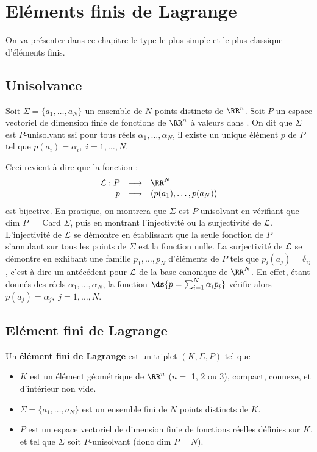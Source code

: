 \chapter{Eléments finis de Lagrange}
%
%
\noindent
On va présenter dans ce chapitre le type le plus simple et le plus classique
d'éléments finis.
%
%
\section{Unisolvance}
%
\noindent
%
\begin{definition}
  \label{def:22}
  Soit $\Sigma=\{ a_1,\ldots,a_N\}$ un ensemble de $N$ points distincts de
  $\RR^n$. Soit $P$ un espace vectoriel de dimension finie de fonctions de
  $\RR^n$ à valeurs dans \RR. On dit que $\Sigma$ est $P$-unisolvant ssi
  pour tous réels $\alpha_1,\ldots,\alpha_N$, il existe un unique
  élément $p$ de $P$ tel que $p(a_i)=\alpha_i,\; i=1,\ldots,N$.
\end{definition}

Ceci revient à dire que la fonction :
\begin{equation}
\label{eq:26}
\begin{array}{rcl}
{\cal L} : P & \longrightarrow & \RR^N\\
p & \longrightarrow & (p(a_1),\ldots,p(a_N))
\end{array}
\end{equation}
est bijective.\saut
%
%
En pratique, on montrera que $\Sigma$ est $P$-unisolvant en vérifiant que
dim $P=$ Card $\Sigma$, puis en montrant l'injectivité ou la surjectivité
de ${\cal L}$.
%
L'injectivité de ${\cal L}$ se démontre en établissant que la seule
fonction de $P$ s'annulant sur tous les points de $\Sigma$ est la fonction
nulle.
%
La surjectivité de ${\cal L}$ se démontre en exhibant une famille
$p_1,\ldots,p_N$ d'éléments de $P$ tels que $p_i(a_j)=\delta_{ij}$, c'est
à dire un antécédent pour ${\cal L}$ de la base canonique de $\RR^N$. En
effet, étant donnés des réels $\alpha_1,\ldots,\alpha_N$, la fonction
$\ds{p=\sum_{i=1}^N \alpha_i p_i}$ vérifie alors $p(a_j)=\alpha_j,\;
j=1,\ldots,N$.
%
%
\section{Elément fini de Lagrange}
\label{sec:lagrange}
\noindent
%
%
\begin{definition}
  Un {\bf élément fini de Lagrange} est un triplet $(K,\Sigma,P)$ tel que
  \begin{itemize}
  \item $K$ est un élément géométrique de $\RR^n$ ($n=$ 1, 2 ou 3),
    compact, connexe, et d'intérieur non vide.
%
  \item $\Sigma=\{a_1,\ldots,a_N\}$ est un ensemble fini de $N$ points
    distincts de $K$.
%
  \item $P$ est un espace vectoriel de dimension finie de fonctions réelles
    définies sur $K$, et tel que $\Sigma$ soit $P$-unisolvant (donc dim $P =
    N$).
  \end{itemize}\label{def:25}
\end{definition}


